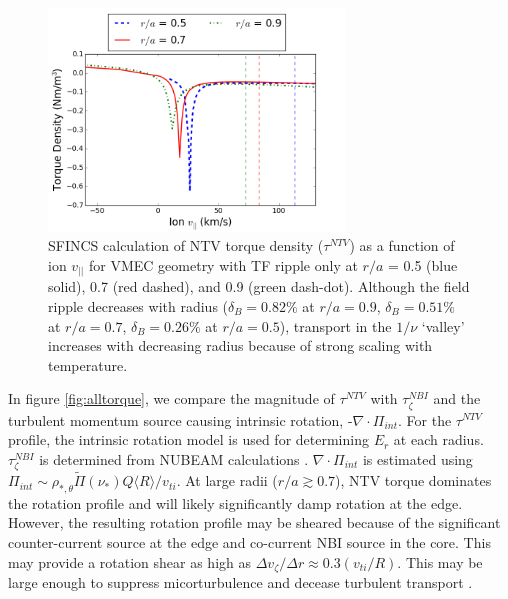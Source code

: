 \documentclass{article}
\begin{document}
\begin{figure}[h!]
\centering
\includegraphics[width=0.7\textwidth]
{Torque_radiusscaling.png}
\caption{\label{fig:Torque_radiusscaling} SFINCS calculation of NTV torque density ($\tau^{NTV}$) as a function of ion $v_{||}$ for VMEC geometry with TF ripple only at $r/a$ = 0.5 (blue solid), 0.7 (red dashed), and 0.9 (green dash-dot). Although the field ripple decreases with radius ($\delta_B = 0.82\%$ at $r/a = 0.9$, $\delta_B = 0.51\%$ at $r/a = 0.7$, $\delta_B = 0.26\%$ at $r/a = 0.5$), transport in the $1/\nu$ `valley' increases with decreasing radius because of strong scaling with temperature. }
\end{figure}

In figure \ref{fig:alltorque}, we compare the magnitude of $\tau^{NTV}$ with $\tau_{\zeta}^{NBI}$ and the turbulent momentum source causing intrinsic rotation, -$\nabla \cdot \Pi_{int}$. For the $\tau^{NTV}$ profile, the intrinsic rotation model is used for determining $E_r$ at each radius. $\tau_{\zeta}^{NBI}$ is determined from NUBEAM calculations \cite{Poli2014}. $\nabla \cdot \Pi_{int}$ is estimated using $\Pi_{int} \sim \rho_{*, \theta} \widetilde{\Pi}(\nu_*) Q \langle R \rangle/v_{ti}$. At large radii ($r/a \gtrsim 0.7$), NTV torque dominates the rotation profile and will likely significantly damp rotation at the edge. However, the resulting rotation profile may be sheared because of the significant counter-current source at the edge and co-current NBI source in the core. This may provide a rotation shear as high as $\Delta v_{\zeta}/ \Delta r \approx 0.3 (v_{ti}/R)$. This may be large enough to suppress micorturbulence and decease turbulent transport \cite{Hahm1994}. 
\end{document}
